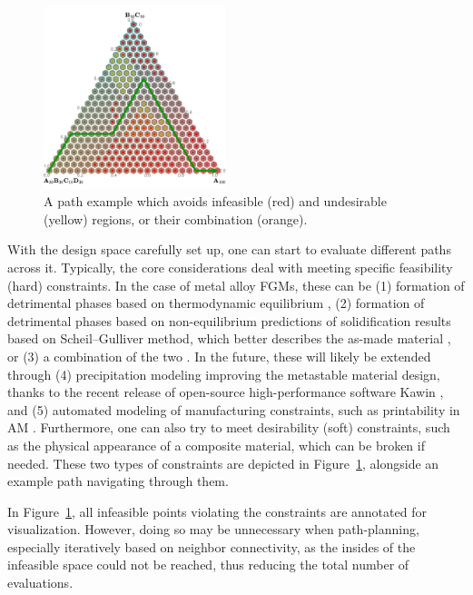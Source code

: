 \begin{figure}[H]
    \centering
    \includegraphics[width=0.475\textwidth]{nimplex/PathPlanning_1.png}
    \vspace{-6pt}
    \caption{A path example which avoids infeasible (red) and undesirable (yellow) regions, or their combination (orange).} 
    \label{nimplex:fig:pathplanning1}
\end{figure}

With the design space carefully set up, one can start to evaluate different paths across it. Typically, the core considerations deal with meeting specific feasibility (hard) constraints. In the case of metal alloy FGMs, these can be (1) formation of detrimental phases based on thermodynamic equilibrium \cite{Reichardt2021AdvancesMaterials}, (2) formation of detrimental phases based on non-equilibrium predictions of solidification results based on Scheil–Gulliver method, which better describes the as-made material \cite{Bocklund2020ExperimentalMaterials}, or (3) a combination of the two \cite{Bobbio2022DesignCompositions}. In the future, these will likely be extended through (4) precipitation modeling improving the metastable material design, thanks to the recent release of open-source high-performance software Kawin \cite{Ury2023Kawin:Model}, and (5) automated modeling of manufacturing constraints, such as printability in AM \cite{SheikhAnAlloys}. Furthermore, one can also try to meet desirability (soft) constraints, such as the physical appearance of a composite material, which can be broken if needed. These two types of constraints are depicted in Figure~\ref{nimplex:fig:pathplanning1}, alongside an example path navigating through them.

In Figure~\ref{nimplex:fig:pathplanning1}, all infeasible points violating the constraints are annotated for visualization. However, doing so may be unnecessary when path-planning, especially iteratively based on neighbor connectivity, as the insides of the infeasible space could not be reached, thus reducing the total number of evaluations. 



